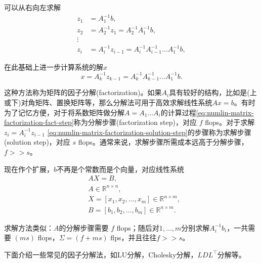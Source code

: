 \begin{subappendices}
可以从右向左求解
\begin{equation}
\label{eq:numlin-matrix-factorization-solution-step}
\begin{split}
    z_{1} & = A_{1}^{-1} b, \\
    z_{2} & = A_{2}^{-1} z_{1} = A_{2}^{-1} A_{1}^{-1} b, \\
    \vdots & \\
    z_{i} &= A_{i}^{-1} z_{i-1} = A_{i}^{-1} A_{i-1}^{-1} \ldots A_{1}^{-1} b,
\end{split}
\end{equation}

在此基础上进一步计算系统的解$x$
\begin{equation*}
  x = A_{k}^{-1} z_{k-1} = A_{k}^{-1} A_{k-1}^{-1} \ldots A_{1}^{-1} b.
\end{equation*}

这种方法称为矩阵的因子分解(factorization)。如果$A_{i}$具有较好的结构，比如是(上或下)对角矩阵、置换矩阵等，那么分解法可用于高效求解线性系统$A x = b$。有时为了记忆方便，对于将系数矩阵做分解$A=A_{1} \ldots A_{i}$的计算过程\eqref{eq:numlin-matrix-factorization-fact-step}称为分解步骤(factorization step)，对应 $f$ flops。对于求解$z_{i} = A_{i}^{-1} z_{i-1}$ \eqref{eq:numlin-matrix-factorization-solution-step}的步骤称为求解步骤(solution step)，对应 $s$ flops。通常来说，求解步骤所需成本远高于分解步骤，$f >> s$。

现在作个扩展，$b$不再是个常数而是个向量，对应线性系统
\begin{equation*}
\begin{split}
  & A X = B,  \\
  & A \in \mathbb{R}^{n \times n}, \\
  & X = \left[ x_{1}, x_{2}, \ldots, x_{m} \right] \in \mathbb{R}^{ n \times m}, \\
  & B = \left[ b_{1}, b_{2}, \ldots, b_{m} \right] \in \mathbb{R}^{ n \times m}.
\end{split}
\end{equation*}

求解方法类似：$A$的分解步骤需要 $f$ flops；随后对$1,\ldots,m$分别求解$A_{i}^{-1} b_{i}$，一共需要 $(m s)$ flops，$\Sigma = \left( f + ms \right)$ flps，并且往往$f >> s$。

下面介绍一些常见的因子分解法，如LU分解，Cholesky分解，$LDL^{\top}$分解等。


\end{subappendices}
